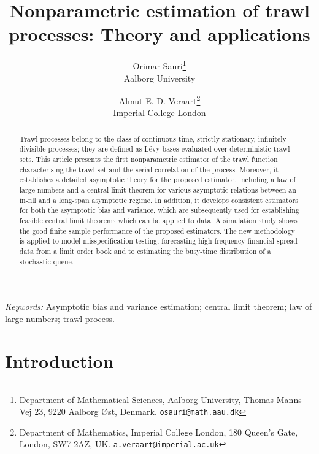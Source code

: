 \documentclass{article}
\title{Nonparametric estimation of trawl processes: Theory and applications}
\author{Orimar Sauri\thanks{
Department of Mathematical Sciences, Aalborg University,
Thomas Manns Vej 23, 
9220 Aalborg Øst,
Denmark.
\texttt{osauri@math.aau.dk}}\\
Aalborg University
\and
Almut E. D. Veraart\thanks{Department of Mathematics, Imperial College London,
180 Queen's Gate, London, SW7 2AZ, UK.
\texttt{a.veraart@imperial.ac.uk}}\\
Imperial College London}
\date{}
\theoremstyle{plain}
\theoremstyle{definition}
\theoremstyle{remark}
\begin{document}
\maketitle
\begin{abstract}
Trawl processes belong to the class of continuous-time, strictly stationary, infinitely divisible processes; they are defined as  L\'{e}vy bases evaluated over deterministic trawl sets. 		
This article presents the first nonparametric estimator of the trawl function characterising the trawl set and the  serial correlation of the process. Moreover, it establishes a detailed asymptotic theory for the proposed estimator, including  a law of large numbers and a central limit theorem for various  asymptotic relations between an in-fill and a long-span asymptotic regime.
In addition, it develops consistent estimators for both the asymptotic bias and variance, which are subsequently used for establishing feasible central limit theorems which can be applied to data. 
A  simulation study shows the good finite sample performance of the proposed estimators. 
The new methodology is applied to model misspecification testing,  forecasting high-frequency financial spread data from a limit order book and to estimating the busy-time distribution of a stochastic queue.
\end{abstract}

\textit{Keywords:} Asymptotic bias and variance estimation; central limit theorem; law of large numbers; trawl process.




\section{Introduction}
\end{document}
